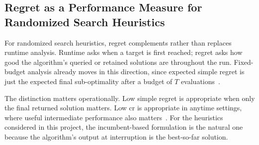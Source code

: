 \subsection{Regret as a Performance Measure for Randomized Search Heuristics}
\label{subsec:regret-as-perf}
For randomized search heuristics, regret complements rather than
replaces runtime analysis. Runtime asks when a target is first
reached; regret asks how good the algorithm's queried or retained
solutions are throughout the run. Fixed-budget analysis already moves
in this direction, since expected simple regret is just the expected
final sub-optimality after a budget of $T$
evaluations~\cite{jansen2014fixed,bubeck2011pure}.

The distinction matters operationally. Low simple regret is
appropriate when only the final returned solution matters. Low
\acrshort{cr} is appropriate in anytime settings, where useful
intermediate performance also
matters~\cite{cesa2006prediction,pinto2018practice}. For the
heuristics considered in this project, the incumbent-based
formulation is the natural one because the algorithm's output at
interruption is the best-so-far solution.

